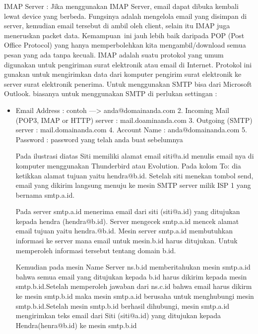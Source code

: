 \documentclass[a4paper,12pt]{report}
\begin{document}
\begin{myEnumerate}
\begin{myEnumerate}
\vspace{12pt}
\noindent 
\item IMAP Server : Jika menggunakan IMAP Server, email dapat dibuka kembali lewat device yang berbeda. Fungsinya adalah mengelola email yang disimpan di server, kemudian email tersebut di ambil oleh client, selain itu IMAP juga meneruskan packet data. Kemampuan~ini jauh lebih baik daripada POP (Post Office Protocol) yang hanya memperbolehkan kita mengambil/download semua pesan yang ada tanpa kecuali. IMAP adalah suatu  protokol yang umum digunakan untuk pengiriman surat elektronik atau email di Internet. Protokol ini gunakan untuk mengirimkan data dari komputer pengirim surat elektronik ke server surat elektronik penerima. Untuk menggunakan SMTP bisa dari Microsoft Outlook. biasanya untuk menggunakan SMTP di perlukan settingan :\end{myEnumerate}
 \par
\vspace{12pt}
\noindent 
\begin{itemize}
\item Email Address : contoh —> anda@domainanda.com 2. Incoming Mail (POP3, IMAP or HTTP) server : mail.doaminanda.com 3. Outgoing (SMTP) server : mail.domainanda.com 4. Account Name : anda@domainanda.com 5. Password : password yang telah anda buat sebelumnya \par
\vspace{12pt}
Pada ilustrasi diatas Siti memiliki alamat email siti@a.id menulis email nya di komputer menggunakan Thunderbird atau Evolution. Pada kolom To: dia ketikkan alamat tujuan yaitu hendra@b.id. Setelah siti menekan tombol send, email yang dikirim langsung menuju ke mesin SMTP server milik ISP 1 yang bernama smtp.a.id. \par
\vspace{12pt}
Pada server smtp.a.id menerima email dari siti (siti@a.id) yang ditujukan kepada hendra (hendra@b.id). Server mengecek smtp.a.id mencek alamat email tujuan yaitu hendra.@b.id. Mesin server smtp.a.id membutuhkan informasi ke server mana email untuk mesin.b.id harus ditujukan. Untuk memperoleh informasi tersebut tentang domain b.id. \par
\vspace{12pt}
Kemudian pada mesin Name Server ns.b.id memberitahukan mesin smtp.a.id bahwa semua email yang ditujukan kepada b.id harus dikirim kepada mesin smtp.b.id.Setelah memperoleh jawaban dari ns.c.id bahwa email harus dikirm ke mesin smtp.b.id maka mesin smtp.a.id berusaha untuk menghubungi mesin smtp.b.id.Setelah mesin smtp.b.id berhasil dihubungi, mesin smtp.a.id mengirimkan teks email dari Siti (siti@a.id) yang ditujukan kepada Hendra(henra@b.id) ke mesin smtp.b.id \par

\end{itemize}
\end{myEnumerate}
\end{document}
